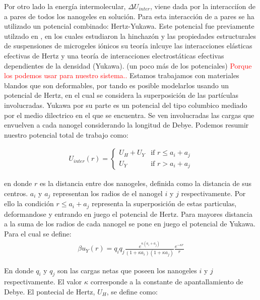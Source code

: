 Por otro lado la energ\'ia intermolecular, $\Delta U_{inter}$, viene dada por la interacci\'ion de a pares de todos los nanogeles en soluci\'on. 
Para esta interacci\'on de a pares se ha utilizado un potencial combinado: Hertz-Yukawa. Este potencial fue previamente utilzado en , en los cuales  
estudiaron la hinchaz\'on y las propiedades estructurales de suspensiones de microgeles i\'onicos su teor\'ia inlcuye las interacciones el\'asticas efectivas de Hertz y una teor\'ia de interacciones electrost\'aticas efectivas dependientes de la densidad (Yukawa). 
(un poco m\'as de los potenciales)
\textcolor{red}{Porque los podemos usar para nuestro sistema..}
Estamos trabajamos con materiales blandos que son deformables, por tando es posible modelarlos usando un potencial de Hertz, en el cual se considera la superposici\'on de las part\'iculas involucradas.
Yukawa por su parte es un potencial del tipo columbico mediado por el medio dilectrico en el que se encuentra. Se ven involucradas las cargas que envuelven a cada nanogel considerando la longitud de Debye. 
Podemos resumir nuestro potencial total de trabajo como:

\begin{align}
	U_{inter}(r) = \begin{cases} U_H + U_Y & \text{if } r \leq a_i + a_j \\ U_Y & \text{if } r > a_i + a_j \end{cases} 
	\label{eq:HY-potential}
\end{align}

en donde $r$ es la distancia entre dos nanogeles, definida como la distancia de sus centros. 
$a_i$ y $a_j$ representan los radios de el nanogel $i$ y $j$ respectivamente. Por ello la condici\'on $r \leq a_i +a_j$ representa la superposici\'on de estas particulas, deformandose y entrando en juego el potencial de Hertz.
Para mayores distancia a la suma de los radios de cada nanogel se pone en juego el potencial de Yukawa. Para el cual se define:
\begin{align}
	\beta u_Y(r) = q_i q_j \frac{e^{\kappa(a_i + a_j)}}{(1 +\kappa a_i)(1 + \kappa a_j)} \frac{e^{-\kappa r}}{r} 
	\label{eq:yukawa}
\end{align}

En donde $q_i$ y $q_j$ son las cargas netas que poseen los nanogeles $i$ y $j$ respectivamente. El valor $\kappa$ corresponde a la constante de apantallamiento de Debye. 
El pontecial de Hertz, $U_H$, se define como:
 

